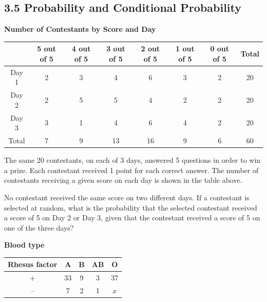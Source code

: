 \subsection*{3.5 Probability and Conditional Probability}

\vspace{0.5em}

\setcounter{questionnum}{0}


\noindent\markforreview

\begin{center}
\textbf{Number of Contestants by Score and Day}
\end{center}
\begin{tabular}{|c|c|c|c|c|c|c|c|}
\hline
 & 5 out of 5 & 4 out of 5 & 3 out of 5 & 2 out of 5 & 1 out of 5 & 0 out of 5 & Total \\
\hline
Day 1 & 2 & 3 & 4 & 6 & 3 & 2 & 20 \\
Day 2 & 2 & 5 & 5 & 4 & 2 & 2 & 20 \\
Day 3 & 3 & 1 & 4 & 6 & 4 & 2 & 20 \\
\hline
Total & 7 & 9 & 13 & 16 & 9 & 6 & 60 \\
\hline
\end{tabular}

\vspace{1em}

The same 20 contestants, on each of 3 days, answered 5 questions in order to win a prize.  
Each contestant received 1 point for each correct answer. The number of contestants receiving a given score on each day is shown in the table above.  

No contestant received the same score on two different days.  
If a contestant is selected at random, what is the probability that the selected contestant received a score of 5 on Day 2 or Day 3, given that the contestant received a score of 5 on one of the three days?

\vspace{0.75em}



\vspace{2em}

\noindent\markforreview


\begin{center}
\textbf{Blood type}
\end{center}
\begin{center}
    

\begin{tabular}{|c|c|c|c|c|}
\hline
Rhesus factor & A & B & AB & O \\
\hline
+ & 33 & 9 & 3 & 37 \\
-- & 7 & 2 & 1 & $x$ \\
\hline
\end{tabular}
\end{center}

